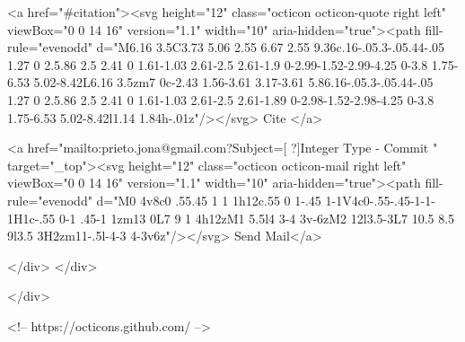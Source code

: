       <a  href="#citation"><svg height="12" class="octicon octicon-quote right left" viewBox="0 0 14 16" version="1.1" width="10" aria-hidden="true"><path fill-rule="evenodd" d="M6.16 3.5C3.73 5.06 2.55 6.67 2.55 9.36c.16-.05.3-.05.44-.05 1.27 0 2.5.86 2.5 2.41 0 1.61-1.03 2.61-2.5 2.61-1.9 0-2.99-1.52-2.99-4.25 0-3.8 1.75-6.53 5.02-8.42L6.16 3.5zm7 0c-2.43 1.56-3.61 3.17-3.61 5.86.16-.05.3-.05.44-.05 1.27 0 2.5.86 2.5 2.41 0 1.61-1.03 2.61-2.5 2.61-1.89 0-2.98-1.52-2.98-4.25 0-3.8 1.75-6.53 5.02-8.42l1.14 1.84h-.01z"/></svg> Cite
      </a>

      <a href="mailto:prieto.jona@gmail.com?Subject=[ ?]Integer Type - Commit " target="_top"><svg height="12" class="octicon octicon-mail right left" viewBox="0 0 14 16" version="1.1" width="10" aria-hidden="true"><path fill-rule="evenodd" d="M0 4v8c0 .55.45 1 1 1h12c.55 0 1-.45 1-1V4c0-.55-.45-1-1-1H1c-.55 0-1 .45-1 1zm13 0L7 9 1 4h12zM1 5.5l4 3-4 3v-6zM2 12l3.5-3L7 10.5 8.5 9l3.5 3H2zm11-.5l-4-3 4-3v6z"/></svg> Send Mail</a>

    </div>
  </div>

</div>

<!-- https://octicons.github.com/ -->





